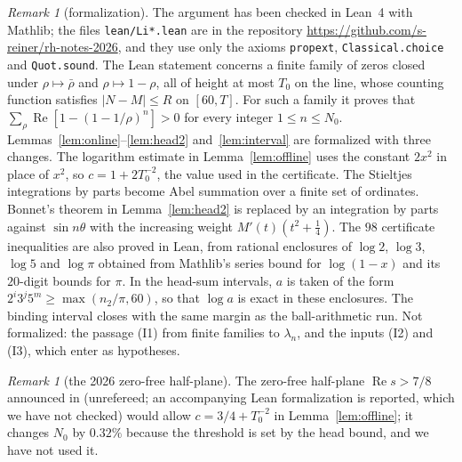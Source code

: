 \documentclass[11pt]{article}
\theoremstyle{remark}
\newtheorem{remark}[theorem]{Remark}
\renewcommand{\Re}{\operatorname{Re}}
\begin{document}
\begin{remark}[formalization]
The argument has been checked in Lean~4 with Mathlib; the files \texttt{lean/Li*.lean} are in the repository \url{https://github.com/s-reiner/rh-notes-2026}, and they use only the axioms \texttt{propext}, \texttt{Classical.choice} and \texttt{Quot.sound}. The Lean statement concerns a finite family of zeros closed under $\rho\mapsto\bar\rho$ and $\rho\mapsto1-\rho$, all of height at most $T_0$ on the line, whose counting function satisfies $|N-M|\le R$ on $[60,T]$. For such a family it proves that $\sum_\rho\Re[1-(1-1/\rho)^n]>0$ for every integer $1\le n\le N_0$. Lemmas~\ref{lem:online}--\ref{lem:head2} and~\ref{lem:interval} are formalized with three changes. The logarithm estimate in Lemma~\ref{lem:offline} uses the constant $2x^2$ in place of $x^2$, so $c=1+2T_0^{-2}$, the value used in the certificate. The Stieltjes integrations by parts become Abel summation over a finite set of ordinates. Bonnet's theorem in Lemma~\ref{lem:head2} is replaced by an integration by parts against $\sin n\theta$ with the increasing weight $M'(t)(t^2+\tfrac14)$. The $98$ certificate inequalities are also proved in Lean, from rational enclosures of $\log2$, $\log3$, $\log5$ and $\log\pi$ obtained from Mathlib's series bound for $\log(1-x)$ and its $20$-digit bounds for $\pi$. In the head-sum intervals, $a$ is taken of the form $2^i3^j5^m\ge\max(n_2/\pi,60)$, so that $\log a$ is exact in these enclosures. The binding interval closes with the same margin as the ball-arithmetic run. Not formalized: the passage (I1) from finite families to $\lambda_n$, and the inputs (I2) and (I3), which enter as hypotheses.
\end{remark}

\begin{remark}[the 2026 zero-free half-plane]
The zero-free half-plane $\Re s>7/8$ announced in \cite{Ope26} (unrefereed; an accompanying Lean formalization is reported, which we have not checked) would allow $c=3/4+T_0^{-2}$ in Lemma~\ref{lem:offline}; it changes $N_0$ by $0.32\%$ because the threshold is set by the head bound, and we have not used it.
\end{remark}
\end{document}
